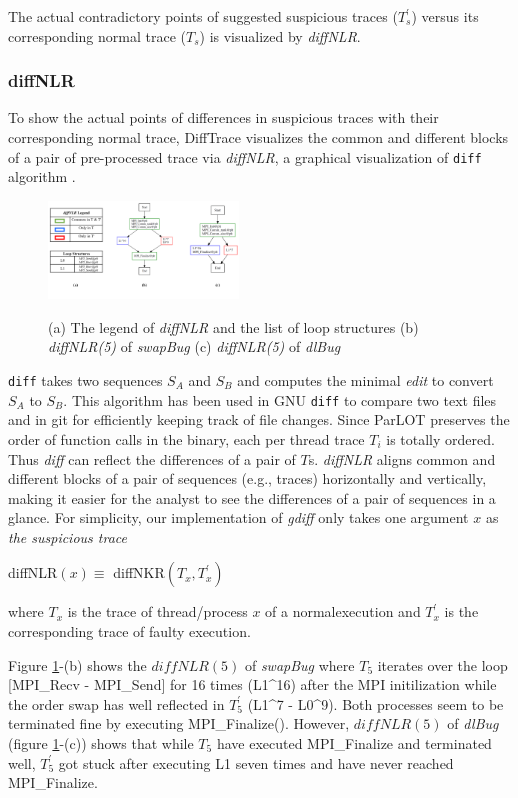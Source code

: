 The actual contradictory points of suggested suspicious traces ($T^\prime_s$) versus its corresponding normal trace ($T_s$) is visualized by \textit{diffNLR}.

\subsubsection{diffNLR}
To show the actual points of differences in suspicious traces with their corresponding normal trace, DiffTrace visualizes the common and different blocks of a pair of pre-processed trace via \textit{diffNLR}, a graphical visualization of \texttt{diff} algorithm \cite{diff-myers}.
%

\begin{figure}[]
\centering
\caption{(a) The legend of \textit{diffNLR} and the list of loop structures (b) \textit{diffNLR(5)} of \textit{swapBug} (c) \textit{diffNLR(5)} of \textit{dlBug}}
\includegraphics[width=0.45\textwidth]{figs/sampleGdiff.png}
\label{fig.gdiffs}
\end{figure}


\texttt{diff} takes two sequences $S_A$ and $S_B$ and computes the minimal \textit{edit} to convert $S_A$ to $S_B$. This algorithm has been used in GNU \texttt{diff} to compare two text files and in git for efficiently keeping track of file changes.
Since ParLOT preserves the order of function calls in the binary, each per thread trace $T_i$ is totally ordered. Thus \textit{diff} can reflect the differences of a pair of $T$s. \textit{diffNLR} aligns common and different blocks of a pair of sequences (e.g., traces) horizontally and vertically, making it easier for the analyst to see the differences of a pair of sequences in a glance.  
For simplicity, our implementation of \textit{gdiff} only takes one argument $x$ as \textit{the suspicious trace}

diffNLR$(x) \equiv $ diffNKR$(T_x,T_x^\prime)$

where $T_x$ is the trace of thread/process $x$ of a normalexecution and $T^\prime_x$ is the corresponding trace of faulty execution.

Figure \ref{fig.gdiffs}-(b) shows the $diffNLR(5)$ of \textit{swapBug} where $T_5$ iterates over the loop [MPI\_Recv - MPI\_Send] for 16 times (L1\^{}16) after the MPI initilization while the order swap has well reflected in $T_5^\prime$ (L1\^{}7 - L0\^{}9). Both processes seem to be terminated fine by executing MPI\_Finalize(). 
However, $diffNLR(5)$ of \textit{dlBug} (figure \ref{fig.gdiffs}-(c)) shows that while $T_5$ have executed MPI\_Finalize and terminated well, $T_5^\prime$ got stuck after executing L1 seven times and have never reached MPI\_Finalize.


